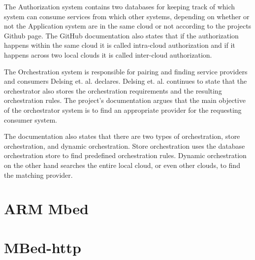 The Authorization system contains two databases for keeping track of which system can consume services from which other systems, depending on whether or not the Application system are in the same cloud or not according to the projects Github page.
The GitHub documentation also states that if the authorization happens within the same cloud it is called intra-cloud authorization and if it happens across two local clouds it is called inter-cloud authorization.\cite{Github2021}

The Orchestration system is responsible for pairing and finding service providers and consumers Delsing et. al. declares.
Delsing et. al. continues to state that the orchestrator also stores the orchestration requirements and the resulting orchestration rules.\cite{Delsing2017} 
The project's documentation argues that the main objective of the orchestrator system is to find an appropriate provider for the requesting consumer system.\cite{Github2021}

The documentation also states that there are two types of orchestration, store orchestration, and dynamic orchestration.
Store orchestration uses the database orchestration store to find predefined orchestration rules.
Dynamic orchestration on the other hand searches the entire local cloud, or even other clouds, to find the matching provider.\cite{Github2021}
\section{ARM Mbed}
\section{MBed-http}